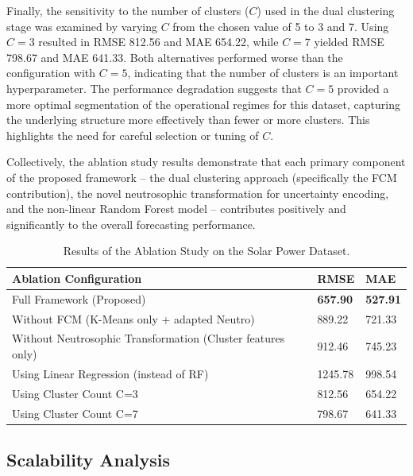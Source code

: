 \documentclass[review,3p,times]{elsarticle}
\begin{document}
Finally, the sensitivity to the number of clusters ($C$) used in the dual clustering stage was examined by varying $C$ from the chosen value of 5 to 3 and 7. Using $C=3$ resulted in RMSE 812.56 and MAE 654.22, while $C=7$ yielded RMSE 798.67 and MAE 641.33. Both alternatives performed worse than the configuration with $C=5$, indicating that the number of clusters is an important hyperparameter. The performance degradation suggests that $C=5$ provided a more optimal segmentation of the operational regimes for this dataset, capturing the underlying structure more effectively than fewer or more clusters. This highlights the need for careful selection or tuning of $C$.

Collectively, the ablation study results demonstrate that each primary component of the proposed framework – the dual clustering approach (specifically the FCM contribution), the novel neutrosophic transformation for uncertainty encoding, and the non-linear Random Forest model – contributes positively and significantly to the overall forecasting performance.

\begin{table}[t!]
\centering
\caption{Results of the Ablation Study on the Solar Power Dataset.}
\label{tab:ablation_results}
\begin{tabular}{|p{6cm}|p{3cm}|p{3cm}|}
\hline
\textbf{Ablation Configuration} & \textbf{RMSE} & \textbf{MAE} \\ \hline
Full Framework (Proposed) & \textbf{657.90} & \textbf{527.91} \\ \hline
Without FCM (K-Means only + adapted Neutro) & 889.22 & 721.33 \\ \hline
Without Neutrosophic Transformation (Cluster features only) & 912.46 & 745.23 \\ \hline
Using Linear Regression (instead of RF) & 1245.78 & 998.54 \\ \hline
Using Cluster Count C=3 & 812.56 & 654.22 \\ \hline
Using Cluster Count C=7 & 798.67 & 641.33 \\ \hline
\end{tabular}
\end{table}

\subsection{Scalability Analysis}
\label{subsec:scalability_analysis}
\end{document}
